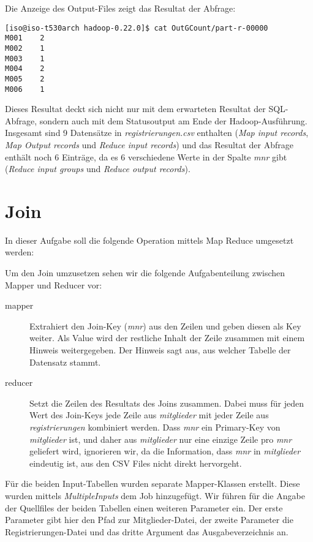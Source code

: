 \documentclass[11pt,a4paper,parskip=half]{scrartcl}
\begin{document}
Die Anzeige des Output-Files zeigt das Resultat der Abfrage:
\begin{lstlisting}
[iso@iso-t530arch hadoop-0.22.0]$ cat OutGCount/part-r-00000 
M001	2
M002	1
M003	1
M004	2
M005	2
M006	1
\end{lstlisting}

Dieses Resultat deckt sich nicht nur mit dem erwarteten Resultat der SQL-Abfrage, sondern auch mit dem Statusoutput am Ende der Hadoop-Ausführung. Insgesamt sind 9 Datensätze in \emph{registrierungen.csv} enthalten (\emph{Map input records}, \emph{Map Output records} und \emph{Reduce input records}) und das Resultat der Abfrage enthält noch 6 Einträge, da es 6 verschiedene Werte in der Spalte \emph{mnr} gibt (\emph{Reduce input groups} und \emph{Reduce output records}).


\newpage
\section{Join}
In dieser Aufgabe soll die folgende Operation mittels Map Reduce umgesetzt werden:


Um den Join umzusetzen sehen wir die folgende Aufgabenteilung zwischen Mapper und Reducer vor:
\begin{description}
	\item[mapper]	Extrahiert den Join-Key (\emph{mnr}) aus den Zeilen und geben diesen als Key weiter. Als Value wird der restliche Inhalt der Zeile zusammen mit einem Hinweis weitergegeben. Der Hinweis sagt aus, aus welcher Tabelle der Datensatz stammt.
	\item[reducer]	Setzt die Zeilen des Resultats des Joins zusammen. Dabei muss für jeden Wert des Join-Keys jede Zeile aus \emph{mitglieder} mit jeder Zeile aus \emph{registrierungen} kombiniert werden. Dass \emph{mnr} ein Primary-Key von \emph{mitglieder} ist, und daher aus \emph{mitglieder} nur eine einzige Zeile pro \emph{mnr} geliefert wird, ignorieren wir, da die Information, dass \emph{mnr} in \emph{mitglieder} eindeutig ist, aus den CSV Files nicht direkt hervorgeht.
\end{description}

Für die beiden Input-Tabellen wurden separate Mapper-Klassen erstellt. Diese wurden mittels \emph{MultipleInputs} dem Job hinzugefügt. Wir führen für die Angabe der Quellfiles der beiden Tabellen einen weiteren Parameter ein. Der erste Parameter gibt hier den Pfad zur Mitglieder-Datei, der zweite Parameter die Registrierungen-Datei und das dritte Argument das Ausgabeverzeichnis an.
\end{document}
